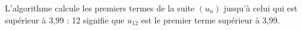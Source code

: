 \begin{enumerate}
\begin{enumerate}
%
%
L'algorithme calcule les premiers termes de la suite $\left(u_n\right)$ jusqu'à celui qui est supérieur à 3,99 : 12 signifie que $u_{12}$ est le premier terme supérieur à 3,99.
	\end{enumerate}
\end{enumerate}

\bigskip

